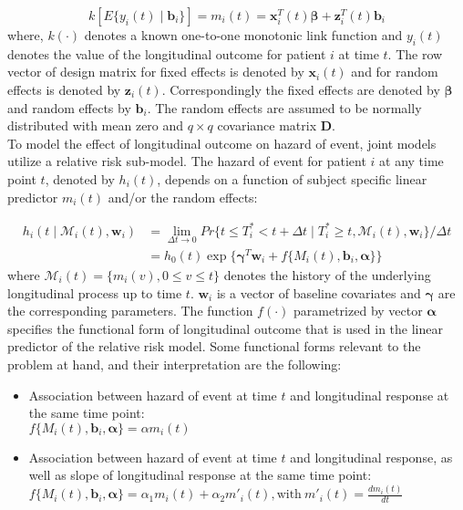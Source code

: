 \begin{equation*}
k[E\{y_i(t) \mid \boldsymbol{b}_i\}] = m_i(t) = \boldsymbol{x}_i^T(t) \boldsymbol{\beta} + \boldsymbol{z}_i^T(t) \boldsymbol{b}_i
\end{equation*}
where, $k(\cdot)$ denotes a known one-to-one monotonic link function and $y_i(t)$ denotes the value of the longitudinal outcome for patient $i$ at time $t$. The row vector of design matrix for fixed effects is denoted by $\boldsymbol{x}_i(t)$ and for random effects is denoted by $\boldsymbol{z}_i(t)$. Correspondingly the fixed effects are denoted by $\boldsymbol{\beta}$ and random effects by $\boldsymbol{b}_i$. The random effects are assumed to be normally distributed with mean zero and $q \times q$ covariance matrix $\boldsymbol{D}$.\\

To model the effect of longitudinal outcome on hazard of event, joint models utilize a relative risk sub-model. The hazard of event for patient $i$ at any time point $t$, denoted by $h_i(t)$, depends on a function of subject specific linear predictor $m_i(t)$ and/or the random effects:

\begin{align*}
h_i(t \mid \mathcal{M}_i(t), \boldsymbol{w}_i) &= \lim_{\Delta t \to 0} Pr\{t \leq T^*_i < t + \Delta t \mid T^*_i \geq t, \mathcal{M}_i(t), \boldsymbol{w}_i\}/\Delta t\\
&=h_0(t) \exp\{\boldsymbol{\gamma}^T\boldsymbol{w}_i + f\{M_i(t), \boldsymbol{b}_i, \boldsymbol{\alpha}\}\}
\end{align*}
where $\mathcal{M}_i(t) = \{m_i(v), 0\leq v \leq t\}$ denotes the history of the underlying longitudinal process up to time $t$. $\boldsymbol{w}_i$ is a vector of baseline covariates and $\boldsymbol{\gamma}$ are the corresponding parameters. The function $f(\cdot)$ parametrized by vector $\boldsymbol{\alpha}$ specifies the functional form \citep{brown2009assessing,rizopoulos2012joint,taylor2013real} of longitudinal outcome that is used in the linear predictor of the relative risk model. Some functional forms relevant to the problem at hand, and their interpretation are the following: 

\begin{itemize}
\item Association between hazard of event at time $t$ and longitudinal response at the same time point:\\
$f\{M_i(t), \boldsymbol{b}_i, \boldsymbol{\alpha}\} = \alpha m_i(t)$
\item Association between hazard of event at time $t$ and longitudinal response, as well as slope of longitudinal response at the same time point:\\
$f\{M_i(t), \boldsymbol{b}_i, \boldsymbol{\alpha}\} = \alpha_1 m_i(t) + \alpha_2 m'_i(t), \text{with}\  m'_i(t) = \frac{d m_i(t)}{dt}$
\end{itemize}

